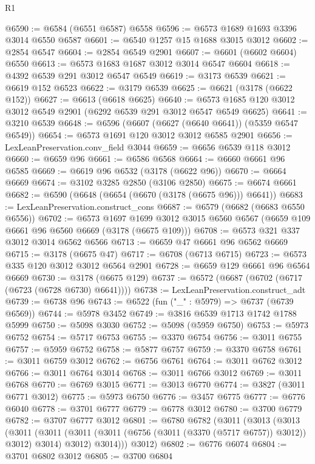 \begin{lexlean}{R1}
\begin{coremodule}
@6590 := @6584 (@6551 @6587) @6558
@6596 := @6573 @1689 @1693 @3396 @3014 @6550 @6587
@6601 := @6540 @1257 @15 @1688 @3015 @3012
@6602 := @2854 @6547
@6604 := @2854 @6549 @2901
@6607 := @6601 (@6602 @6604) @6550
@6613 := @6573 @1683 @1687 @3012 @3014 @6547 @6604
@6618 := @4392 @6539 @291 @3012 @6547 @6549
@6619 := @3173 @6539
@6621 := @6619 @152 @6523
@6622 := @3179 @6539
@6625 := @6621 (@3178 (@6622 @152))
@6627 := @6613 (@6618 @6625)
@6640 := @6573 @1685 @120 @3012 @3012 @6549 @2901 (@6292 @6539 @291 @3012 @6547 @6549 @6625)
@6641 := @3210 @6539
@6648 := @6596 (@6607 (@6627 (@6640 @6641)) (@5359 @6547 @6549))
@6654 := @6573 @1691 @120 @3012 @3012 @6585 @2901
@6656 := LexLeanPreservation.conv_field @3044
@6659 := @6656 @6539 @118 @3012
@6660 := @6659 @96
@6661 := @6586 @6568
@6664 := @6660 @6661 @96 @6585
@6669 := @6619 @96 @6532 (@3178 (@6622 @96))
@6670 := @6664 @6669
@6674 := @3102 @3285 @2850 (@3106 @2850)
@6675 := @6674 @6661
@6682 := @6590 (@6648 (@6654 (@6670 (@3178 (@6675 @96))) @6641))
@6683 := LexLeanPreservation.construct_cons
@6687 := @6579 (@6682 (@6683 @6550 @6556))
@6702 := @6573
    @1697
    @1699
    @3012
    @3015
    @6560
    @6567
    (@6659 @109 @6661 @96 @6560 @6669 (@3178 (@6675 @109)))
@6708 := @6573 @321 @337 @3012 @3014 @6562 @6566
@6713 := @6659 @47 @6661 @96 @6562 @6669
@6715 := @3178 (@6675 @47)
@6717 := @6708 (@6713 @6715)
@6723 := @6573 @335 @120 @3012 @3012 @6564 @2901
@6728 := @6659 @129 @6661 @96 @6564 @6669
@6730 := @3178 (@6675 @129)
@6737 := @6572 (@6687 (@6702 (@6717 (@6723 (@6728 @6730) @6641))))
@6738 := LexLeanPreservation.construct_adt
@6739 := @6738 @96
@6743 := @6522 (fun ("_" : @5979) => @6737 (@6739 @6569))
@6744 := @5978 @3452
@6749 := @3816 @6539 @1713 @1742 @1788 @5999
@6750 := @5098 @3030
@6752 := @5098 (@5959 @6750)
@6753 := @5973 @6752
@6754 := @5717 @6753
@6755 := @3370 @6754
@6756 := @3011 @6755
@6757 := @5959 @6752
@6758 := @5877 @6757
@6759 := @3370 @6758
@6761 := @3011 @6759 @3012
@6762 := @6756 @6761
@6764 := @3011 @6762 @3012
@6766 := @3011 @6764 @3014
@6768 := @3011 @6766 @3012
@6769 := @3011 @6768
@6770 := @6769 @3015
@6771 := @3013 @6770
@6774 := @3827 (@3011 @6771 @3012)
@6775 := @5973 @6750
@6776 := @3457 @6775
@6777 := @6776 @6040
@6778 := @3701 @6777
@6779 := @6778 @3012
@6780 := @3700 @6779
@6782 := @3707 @6777 @3012
@6801 := @6780
    @6782
    (@3011
      (@3013
        (@3013
          (@3011
            (@3011 (@3011 (@3011 (@6756 (@3011 (@3370 (@5717 @6757)) @3012)) @3012) @3014) @3012)
            @3014)))
      @3012)
@6802 := @6776 @6074
@6804 := @3701 @6802 @3012
@6805 := @3700 @6804

\end{coremodule}
\end{lexlean}

